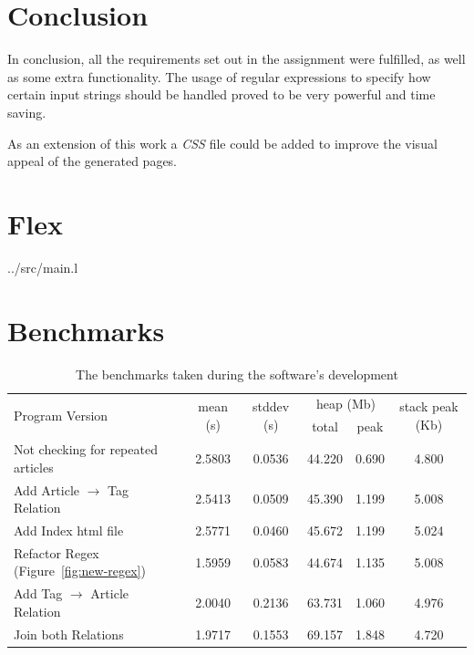 \documentclass[a4paper]{report}
\begin{document}
\chapter{Conclusion}

In conclusion, all the requirements set out in the assignment were fulfilled, as
well as some extra functionality. The usage of regular expressions to specify
how certain input strings should be handled proved to be very powerful and time
saving.

As an extension of this work a \textit{CSS} file could be added to
improve the visual appeal of the generated pages.

\appendix

\chapter{Flex}


{../src/main.l}

\chapter{Benchmarks}\label{app:benches}
\begin{table}[h]
    \begin{tabular}{l c c c c c}
        \multirow{2}{*}{Program Version} & \multirow{2}{*}{mean (s)} &
        \multirow{2}{*}{stddev (s)} & \multicolumn{2}{c}{heap (Mb)} &
        \multirow{2}{*}{stack peak (Kb)}\\

        &    &    & total & peak & \\\toprule

        Not checking for repeated articles
        &2.5803&0.0536&44.220  &0.690  &4.800\\

        Add Article $\to$ Tag Relation
        &2.5413&0.0509&45.390  &1.199  &5.008\\

        Add Index html file
        &2.5771&0.0460&45.672  &1.199  &5.024\\

        Refactor Regex (Figure~\ref{fig:new-regex})
        &1.5959&0.0583&44.674  &1.135  &5.008\\

        Add Tag $\to$ Article Relation
        &2.0040&0.2136&63.731  &1.060  &4.976\\

        Join both Relations
        &1.9717&0.1553&69.157  &1.848  &4.720\\\bottomrule

    \end{tabular}
    \caption{The benchmarks taken during the software's development}
\end{table}
\end{document}
